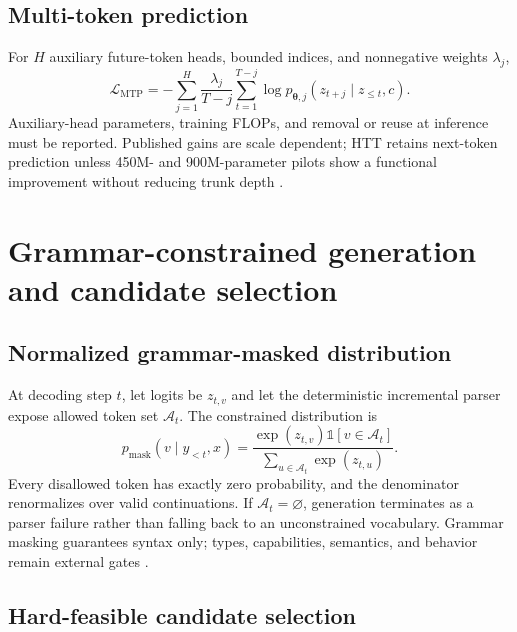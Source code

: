 \documentclass[10pt,letterpaper]{article}
\newcommand{\1}{\mathbb{1}}
\newcommand{\vect}[1]{\bm{#1}}
\begin{document}
\subsection{Multi-token prediction}

For $H$ auxiliary future-token heads, bounded indices, and nonnegative weights $\lambda_j$,
\begin{equation}
  \mathcal L_{\mathrm{MTP}}
  =-\sum_{j=1}^{H}\frac{\lambda_j}{T-j}
    \sum_{t=1}^{T-j}
    \log p_{\vect\theta,j}(z_{t+j}\mid z_{\le t},c).
  \label{eq:mtp}
\end{equation}
Auxiliary-head parameters, training FLOPs, and removal or reuse at inference must be reported.
Published gains are scale dependent; HTT retains next-token prediction unless 450M- and 900M-parameter
pilots show a functional improvement without reducing trunk depth \cite{gloeckle2024mtp}.

\section{Grammar-constrained generation and candidate selection}

\subsection{Normalized grammar-masked distribution}

At decoding step $t$, let logits be $z_{t,v}$ and let the deterministic incremental parser expose
allowed token set $\mathcal A_t$.  The constrained distribution is
\begin{equation}
  p_{\mathrm{mask}}(v\mid y_{<t},x)
  =\frac{\exp(z_{t,v})\1[v\in\mathcal A_t]}
         {\sum_{u\in\mathcal A_t}\exp(z_{t,u})}.
  \label{eq:grammar-mask}
\end{equation}
Every disallowed token has exactly zero probability, and the denominator renormalizes over valid
continuations.  If $\mathcal A_t=\varnothing$, generation terminates as a parser failure rather than
falling back to an unconstrained vocabulary.  Grammar masking guarantees syntax only; types,
capabilities, semantics, and behavior remain external gates \cite{ugare2024syncode}.

\subsection{Hard-feasible candidate selection}
\end{document}

